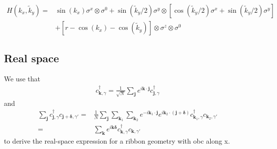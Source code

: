 \documentclass[english]{scrartcl}
\begin{document}
\begin{align*}
H(k_x, \tilde k_y) =& \sin(k_x) \sigma^x \otimes \sigma^0 + \sin(\tilde k_y/2) \sigma^y \otimes \left[\cos(\tilde k_y/2) \sigma^x +  \sin(\tilde k_y/2)\sigma^y \right ] \\
& +  \left[r - \cos(k_x) - \cos(\tilde k_y) \right] \otimes \sigma^z \otimes \sigma^0
\end{align*}

\subsection{Real space}
We use that 
\begin{align*}
c^\dagger_{\bm{k}, \gamma}  = \frac{1}{\sqrt{N}} \sum_{\bm j } e^{i \bm k \cdot \bm j}  c^\dagger_{\bm j, \gamma}
\end{align*}
and
\begin{align*}
\sum_{\bm j } c^\dagger_{\bm{j}, \gamma} c_{\bm{j} + \bm \delta, \gamma'}   =& \frac{1}{N} \sum_{\bm j} \sum_{\bm k_1} \sum_{\bm k_2}  e^{-i \bm k_1 \cdot \bm j }   e^{i \bm k_2 \cdot (\bm j + \bm \delta) }  c^\dagger_{\bm k_1, \gamma} c_{\bm k_2, \gamma'} \\
=& \sum_{\bm k} e^{i \bm k \bm \delta} c^\dagger_{\bm k, \gamma} c_{\bm k, \gamma'}
\end{align*}
to derive the real-space expression for a ribbon geometry with \gls{obc} along x.
\printnoidxglossaries
\end{document}
